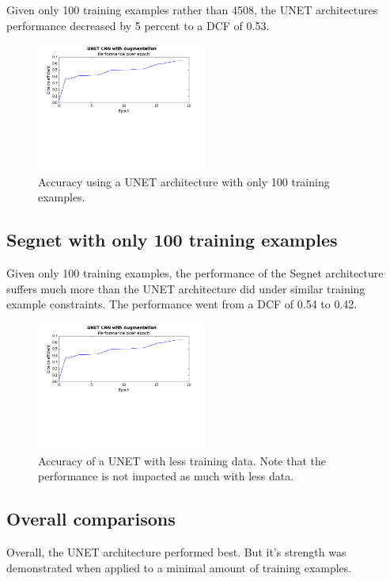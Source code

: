 \documentclass[letterpaper]{article}
\begin{document}
Given only 100 training examples rather than 4508, the UNET architectures performance decreased by 5 percent to a DCF of 0.53. 

 \begin{figure}[H]
  \centerline{\includegraphics[width=0.5\textwidth]{Plots/SegNet.png}}
  \caption{Accuracy using a UNET architecture with only 100 training examples.}
  \label{fig:trainingovertime2.}
\end{figure}

\subsection{Segnet with only 100 training examples}
Given only 100 training examples, the performance of the Segnet architecture suffers much more than the UNET architecture did under similar training example constraints. The performance went from a DCF of 0.54 to 0.42.
 
 \begin{figure}[H]
  \centerline{\includegraphics[width=0.5\textwidth]{Plots/SegNet.png}}
  \caption{Accuracy of a UNET with less training data. Note that the performance is not impacted as much with less data.}
  \label{fig:trainingovertime2.}
\end{figure}

\subsection{Overall comparisons}
Overall, the UNET architecture performed best. But it's strength was demonstrated when applied to a minimal amount of training examples. 
\end{document}
